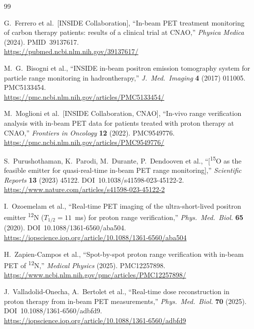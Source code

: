 \documentclass[11pt]{article}
\newcommand{\iso}[2]{\textsuperscript{#1}#2}
\begin{document}
\begin{thebibliography}{99}

G.~Ferrero et al.\ [INSIDE Collaboration],
``In-beam PET treatment monitoring of carbon therapy patients: results of a
clinical trial at CNAO,''
\textit{Physica Medica} (2024). PMID~39137617.\\
\url{https://pubmed.ncbi.nlm.nih.gov/39137617/}

M.~G.~Bisogni et al.,
``INSIDE in-beam positron emission tomography system for particle range
monitoring in hadrontherapy,''
\textit{J.\ Med.\ Imaging} \textbf{4} (2017) 011005. PMC5133454.\\
\url{https://pmc.ncbi.nlm.nih.gov/articles/PMC5133454/}

M.~Moglioni et al.\ [INSIDE Collaboration, CNAO],
``In-vivo range verification analysis with in-beam PET data for patients treated
with proton therapy at CNAO,''
\textit{Frontiers in Oncology} \textbf{12} (2022). PMC9549776.\\
\url{https://pmc.ncbi.nlm.nih.gov/articles/PMC9549776/}

S.~Purushothaman, K.~Parodi, M.~Durante, P.~Dendooven et al.,
``[\iso{15}{O} as the feasible emitter for quasi-real-time in-beam PET range
monitoring],''
\textit{Scientific Reports} \textbf{13} (2023) 45122.
DOI~10.1038/s41598-023-45122-2.\\
\url{https://www.nature.com/articles/s41598-023-45122-2}

I.~Ozoemelam et al.,
``Real-time PET imaging of the ultra-short-lived positron emitter \iso{12}{N}
($T_{1/2}=11$~ms) for proton range verification,''
\textit{Phys.\ Med.\ Biol.} \textbf{65} (2020). DOI~10.1088/1361-6560/aba504.\\
\url{https://iopscience.iop.org/article/10.1088/1361-6560/aba504}

H.~Zapien-Campos et al.,
``Spot-by-spot proton range verification with in-beam PET of \iso{12}{N},''
\textit{Medical Physics} (2025). PMC12257898.\\
\url{https://www.ncbi.nlm.nih.gov/pmc/articles/PMC12257898/}

J.~Valladolid-Onecha, A.~Bertolet et al.,
``Real-time dose reconstruction in proton therapy from in-beam PET measurements,''
\textit{Phys.\ Med.\ Biol.} \textbf{70} (2025). DOI~10.1088/1361-6560/adbfd9.\\
\url{https://iopscience.iop.org/article/10.1088/1361-6560/adbfd9}


\end{thebibliography}
\end{document}
